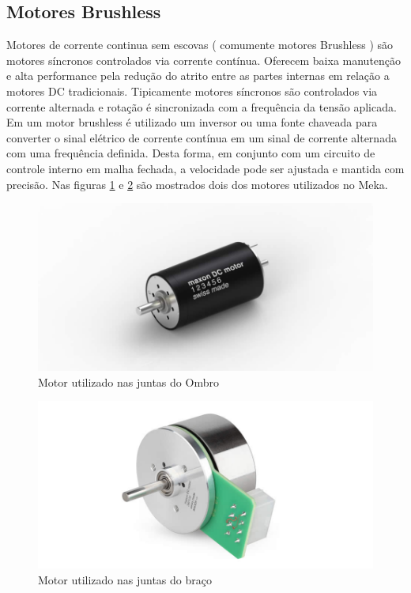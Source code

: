 


\subsection{Motores Brushless}
Motores de corrente continua sem escovas ( comumente motores Brushless ) são motores síncronos controlados via corrente contínua. Oferecem baixa manutenção e alta performance pela redução do atrito entre as partes internas em relação a motores DC tradicionais. Tipicamente motores síncronos são controlados via corrente alternada e rotação é sincronizada com a frequência da tensão aplicada. Em um motor brushless é utilizado um inversor ou uma fonte chaveada para converter o sinal elétrico de corrente contínua em um sinal de corrente alternada com uma frequência definida. Desta forma, em conjunto com um circuito de controle interno em malha fechada, a velocidade pode ser ajustada e mantida com precisão. \cite{nobody} Nas figuras \ref{fig:maxon-servo} e \ref{fig:maxon-flat-servo} são mostrados dois dos motores utilizados no Meka.

\begin{figure}[H]
    \centering
    \includegraphics[width = 0.6\linewidth]{figs/maxon_servo.jpg}
    \caption{Motor utilizado nas juntas do Ombro}
    \label{fig:maxon-servo}
\end{figure}

\begin{figure}[H]
    \centering
    \includegraphics[width = 0.6\linewidth]{figs/maxon_flat_servo.jpg}
    \caption{Motor utilizado nas juntas do braço}
    \label{fig:maxon-flat-servo}
\end{figure}

